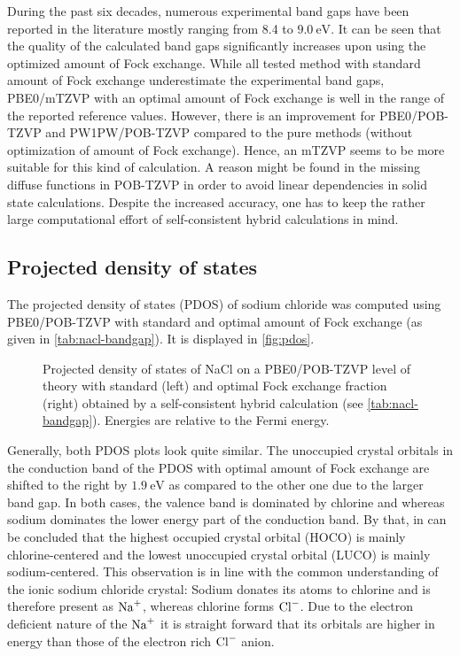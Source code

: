 \documentclass[a4paper,12pt,parskip=half]{scrartcl}
\begin{document}
%
During the past six decades, numerous experimental band gaps have been reported in the literature\autocite[]{nacl-bandgaps} mostly ranging from 8.4 to $ \SI{9.0}{\electronvolt}$. It can be seen that the quality of the calculated band gaps significantly increases upon using the optimized amount of Fock exchange. While all tested method with standard amount of Fock exchange underestimate the experimental band gaps, PBE0/mTZVP with an optimal amount of Fock exchange is well in the range of the reported reference values. However, there is an improvement for PBE0/POB-TZVP and PW1PW/POB-TZVP compared to the pure methods (without optimization of amount of Fock exchange). Hence, an mTZVP seems to be more suitable for this kind of calculation. A reason might be found in the missing diffuse functions in POB-TZVP in order to avoid linear dependencies in solid state calculations. Despite the increased accuracy, one has to keep the rather large computational effort of self-consistent hybrid calculations in mind.
%
\subsection{Projected density of states}
%
The projected density of states (PDOS) of sodium chloride was computed using PBE0/POB-TZVP with standard and optimal amount of Fock exchange (as given in \autoref{tab:nacl-bandgap}). It is displayed in \autoref{fig:pdos}.
%
\begin{figure}
	\centering
	
	\vspace{-20pt}
	\caption{Projected density of states of NaCl on a PBE0/POB-TZVP level of theory with standard (left) and optimal Fock exchange fraction (right) obtained by a self-consistent hybrid calculation (see \autoref{tab:nacl-bandgap}). Energies are relative to the Fermi energy.}
	\label{fig:pdos}
\end{figure}
%
Generally, both PDOS plots look quite similar. The unoccupied crystal orbitals in the conduction band of the PDOS with optimal amount of Fock exchange are shifted to the right by $ \SI{1.9}{\electronvolt} $ as compared to the other one due to the larger band gap. In both cases, the valence band is dominated by chlorine and whereas sodium dominates the lower energy part of the conduction band. By that, in can be concluded that the highest occupied crystal orbital (HOCO) is mainly chlorine-centered and the lowest unoccupied crystal orbital (LUCO) is mainly sodium-centered. This observation is in line with the common understanding of the ionic sodium chloride crystal: Sodium donates its atoms to chlorine and is therefore present as $ \ce{Na^+} $, whereas chlorine forms $ \ce{Cl^-} $. Due to the electron deficient nature of the $ \ce{Na^+} $ it is straight forward that its orbitals are higher in energy than those of the electron rich $ \ce{Cl^-} $ anion.
%
\newpage
\end{document}
